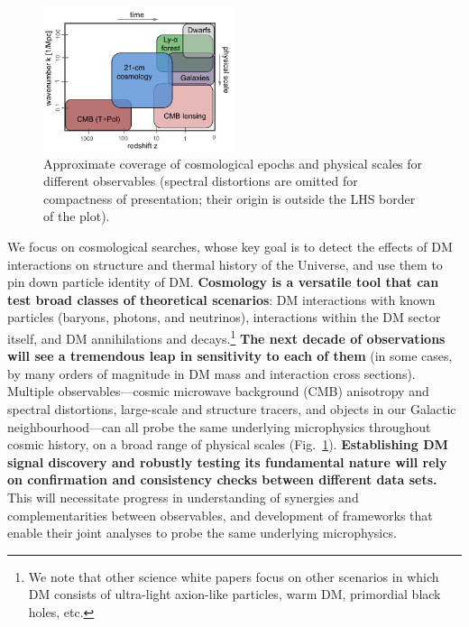 \documentclass[12pt]{article}
\begin{document}
\begin{figure}
\begin{center}
\vspace{-0.9cm}
\includegraphics[width=0.5\textwidth]{scales.png}
\end{center}
\vspace{-0.8cm}
\caption{Approximate coverage of cosmological epochs and physical scales for different observables (spectral distortions are omitted for compactness of presentation; their origin is outside the LHS border of the plot).}
\vspace{-0.2cm}
\label{fig:scales}
\end{figure}
We focus on cosmological searches, whose key goal is to detect the effects of DM interactions on structure and thermal history of the Universe, and use them to pin down particle identity of DM.
\textbf{Cosmology is a versatile tool that can test broad classes of theoretical scenarios}: DM interactions with known particles (baryons, photons, and neutrinos), interactions within the DM sector itself, and DM annihilations and decays.\footnote{We note that other science white papers focus on other scenarios in which DM consists of ultra-light axion-like particles, warm DM, primordial black holes, etc.}
\textbf{The next decade of observations will see a tremendous leap in sensitivity to each of them} (in some cases, by many orders of magnitude in DM mass and interaction cross sections).
Multiple observables---cosmic microwave background (CMB) anisotropy and spectral distortions, large-scale and structure tracers, and objects in our Galactic neighbourhood---can all probe the same underlying microphysics throughout cosmic history, on a broad range of physical scales (Fig.~\ref{fig:scales}).
\textbf{Establishing DM signal discovery and robustly testing its fundamental nature will rely on confirmation and consistency checks between different data sets.}
This will necessitate progress in understanding of synergies and complementarities between observables, and development of frameworks that enable their joint analyses to probe the same underlying microphysics.
\end{document}
